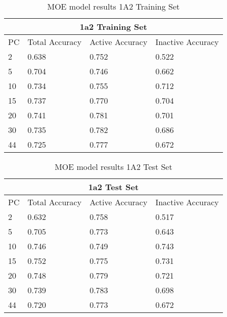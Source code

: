 \begin{table}[h]
\begin{tabular}{|l|l|l|l|}
\hline
\multicolumn{4}{|c|}{1a2 Training Set}                                                                \\ \hline
PC & Total Accuracy & Active Accuracy & Inactive Accuracy  \\ \hline
2  & 0.638          & 0.752           & 0.522     \\ \hline
5  & 0.704          & 0.746           & 0.662     \\ \hline
10 & 0.734          & 0.755           & 0.712     \\ \hline
15 & 0.737          & 0.770           & 0.704     \\ \hline
20 & 0.741          & 0.781           & 0.701     \\ \hline
30 & 0.735          & 0.782           & 0.686     \\ \hline
44 & 0.725          & 0.777           & 0.672     \\ \hline
\end{tabular}
\caption{MOE model results 1A2 Training Set}
\end{table}


\begin{table}[h]
\begin{tabular}{|l|l|l|l|}
\hline
\multicolumn{4}{|c|}{1a2 Test Set}                                                                    \\ \hline
PC & Total Accuracy & Active Accuracy & Inactive Accuracy \\ \hline
2  & 0.632          & 0.758           & 0.517   \\ \hline
5  & 0.705          & 0.773           & 0.643   \\ \hline
10 & 0.746          & 0.749           & 0.743   \\ \hline
15 & 0.752          & 0.775           & 0.731   \\ \hline
20 & 0.748          & 0.779           & 0.721   \\ \hline
30 & 0.739          & 0.783           & 0.698   \\ \hline
44 & 0.720          & 0.773           & 0.672   \\ \hline
\end{tabular}
\caption{MOE model results 1A2 Test Set}
\end{table}



